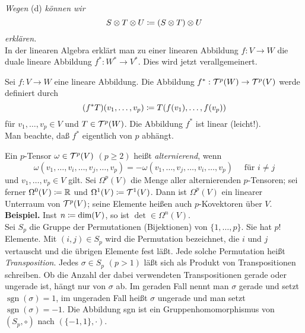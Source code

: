 \documentclass[a4paper,twoside,DIV15,BCOR12mm]{scrbook}
\DeclareMathOperator{\sgn}{sgn}
\begin{document}
\noindent
{\em Wegen} (d) {\em können wir
\[ S \otimes T \otimes U \da  (S \otimes T) \otimes U \]
erklären.}\\

\noindent
In der linearen Algebra erklärt man zu einer linearen Abbildung $f: 
V \to W$ die duale lineare Abbildung $f^{*}: W^{*} \to V^{*}$. Dies 
wird jetzt verallgemeinert.

\bigskip

 Sei $f: V \to W$ eine lineare Abbildung. 
Die Abbildung $f^{*}: {\cal T}^{p}(W) \to {\cal T}^{p}(V)$ werde 
definiert durch
\[ (f^{*}T)(v_{1},\dots,v_{p}) \da  T(f(v_{1}),\dots,f(v_{p})) \]
für $v_{1},\dots,v_{p} \in V$ und $T \in {\cal T}^{p}(W)$. Die 
Abbildung $f^{*}$ ist linear (leicht!).\\

\noindent
Man beachte, daß $f^{*}$ eigentlich von $p$ abhängt.\\

\bigskip

 Ein $p$-Tensor $\omega \in {\cal 
T}^{p}(V)$ $(p \ge 2)$ heißt {\em alternierend}, wenn
\[ \omega(v_{1},\dots,v_{i},\dots,v_{j},\dots,v_{p}) = 
-\omega(v_{1},\dots,v_{j},\dots,v_{i},\dots,v_{p}) \quad \mbox{ für } 
i \not= j \]
und $v_{1},\dots,v_{p} \in V$ gilt. Sei $\Omega^{p}(V)$ die Menge 
aller alternierenden $p$-Tensoren; sei ferner $\Omega^{0}(V) \da  
{\mathbb R}$ und $\Omega^{1}(V) \da  {\cal T}^{1}(V)$. Dann ist 
$\Omega^{p}(V)$ ein linearer Unterraum von ${\cal T}^{p}(V)$; seine 
Elemente heißen auch $p$-Kovektoren über $V$.\\

\noindent
{\bf Beispiel.} Inst $n\da \text{dim}(V)$, so ist $\det\in\Omega^n(V)$.\\

\noindent
Sei $S_{p}$ die Gruppe der Permutationen (Bijektionen) von 
$\{1,\dots,p\}$. Sie hat $p!$ Elemente. Mit $(i,j) \in S_{p}$ wird die 
Permutation bezeichnet, die $i$ und $j$ vertauscht und die übrigen 
Elemente fest läßt. Jede solche Permutation heißt {\em 
Transposition}. Jedes $\sigma \in S_{p}$ $(p > 1)$ läßt sich als 
Produkt von Transpositionen schreiben. Ob die Anzahl der dabei 
verwendeten Transpositionen gerade oder ungerade ist, hängt nur von 
$\sigma$ ab. Im geraden Fall nennt man $\sigma$ gerade und setzt $\sgn(\sigma) = 1$, im ungeraden Fall heißt $\sigma$ ungerade und man 
setzt $\sgn (\sigma) = -1$. Die Abbildung sgn ist ein 
Gruppenhomomorphismus von $(S_{p},\circ)$ nach $(\{-1,1\},\cdot)$.
\end{document}
